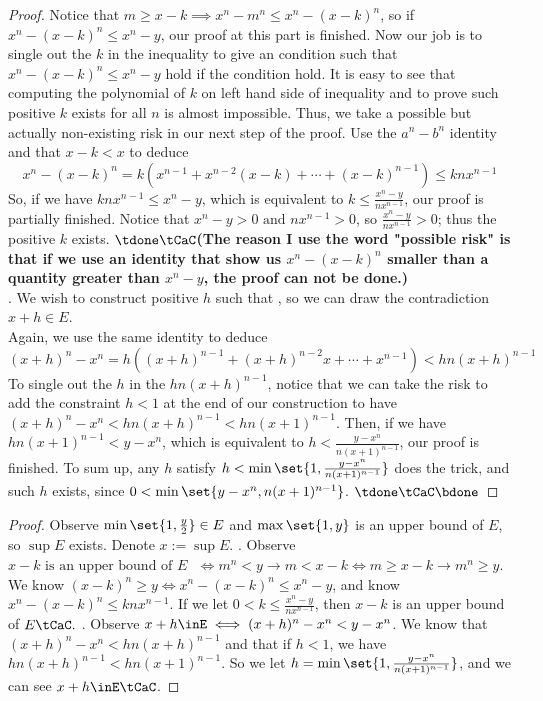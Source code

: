 \documentclass{report}
\begin{document}
\begin{proof}
Notice that $m\geq x-k\implies x^n-m^n\leq x^n-(x-k)^n$, so if $x^n-(x-k)^n\leq x^n-y$, our proof at this part is finished. Now our job is to single out the $k$ in the inequality to give an condition such that $x^n-(x-k)^n\leq x^n-y$ hold if the condition hold. It is easy to see that computing the polynomial of $k$ on left hand side of inequality and to prove such positive $k$ exists for all $n$ is almost impossible. Thus, we take a possible but actually non-existing risk in our next step of the proof. Use the $a^n-b^n$ identity and that $x-k<x$ to deduce
\begin{equation*}
x^n-(x-k)^n=k(x^{n-1}+x^{n-2}(x-k)+\cdots +(x-k)^{n-1})\leq knx^{n-1}
\end{equation*}
So, if we have $knx^{n-1}\leq x^n-y$, which is equivalent to $k\leq \frac{x^n-y}{nx^{n-1}}$, our proof is partially finished. Notice that $x^n-y>0\text{ and }nx^{n-1}>0$, so $\frac{x^n-y}{nx^{n-1}}>0$; thus the positive $k$ exists.  $\tdone\tCaC$\textbf{(The reason I use the word "possible risk" is that if we use an identity that show us $x^n-(x-k)^n$ smaller than a quantity greater than $x^n-y$, the proof can not be done.)} \\

. We wish to construct positive $h$ such that , so we can draw the contradiction $x+h\in E$.\\

Again, we use the same identity to deduce
 \begin{equation*}
   (x+h)^n-x^n=h((x+h)^{n-1}+(x+h)^{n-2}x+\cdots +x^{n-1})<hn(x+h)^{n-1}
\end{equation*}
To single out the $h$ in the  $hn(x+h)^{n-1}$, notice that we can take the risk to add the constraint $h<1$ at the end of our construction to have $(x+h)^n-x^n<hn(x+h)^{n-1}<hn(x+1)^{n-1}$. Then, if we have $hn(x+1)^{n-1}<y-x^n$, which is equivalent to $h<\frac{y-x^n}{n(x+1)^{n-1}} $, our proof is finished. To sum up, any $h$ satisfy  $h<\min \set{1,\frac{y-x^n}{n(x+1)^{n-1}}}$ does the trick, and such $h$ exists, since  $0<\min \set{y-x^n,n(x+1)^{n-1}}$. $\tdone\tCaC\bdone$   
\end{proof}
\begin{proof}
  Observe $\min \set{1,\frac{y}{2}}\in E$ and $\max \set{1,y}$ is an upper bound of $E$, so $\sup E$ exists.  Denote $x:=\sup E$. . Observe $x-k\text{ is an upper bound of $E$ }\iff m^n<y\longrightarrow m<x-k\iff m\geq x-k\longrightarrow m^n\geq y$. We know $(x-k)^n\geq y\iff x^n-(x-k)^n\leq x^n-y$, and know $x^n-(x-k)^n\leq knx^{n-1}$. If we let $0<k\leq \frac{x^n-y}{nx^{n-1}}$, then $x-k$ is an upper bound of  $E\tCaC.$ . Observe $x+h\inE\iff (x+h)^n-x^n<y-x^n$. We know that $(x+h)^n-x^n<hn(x+h)^{n-1}$ and that if $h<1$, we have  $hn(x+h)^{n-1}<hn(x+1)^{n-1}$. So we let  $h=\min \set{1,\frac{y-x^n}{n(x+1)^{n-1}}}$, and we can see $x+h\inE\tCaC$. 
\end{proof}
\end{document}
